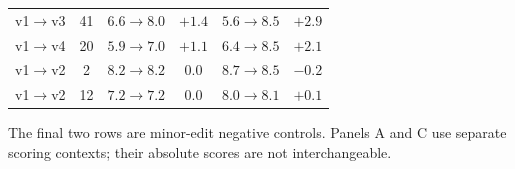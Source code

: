 \begin{table}[htbp]
\begin{tabularx}{\linewidth}{@{}Yccccc@{}}
 v1$\to$v3 & 41 & $6.6\to8.0$ & $+1.4$ & $5.6\to8.5$ & $+2.9$ \\
 v1$\to$v4 & 20 & $5.9\to7.0$ & $+1.1$ & $6.4\to8.5$ & $+2.1$ \\
 v1$\to$v2 & 2 & $8.2\to8.2$ & $0.0$ & $8.7\to8.5$ & $-0.2$ \\
 v1$\to$v2 & 12 & $7.2\to7.2$ & $0.0$ & $8.0\to8.1$ & $+0.1$ \\
\bottomrule\end{tabularx}
\smallskip
\begin{minipage}{\linewidth}\scriptsize The final two rows are minor-edit negative controls. Panels A and C use separate scoring contexts; their absolute scores are not interchangeable.\end{minipage}
\end{table}

